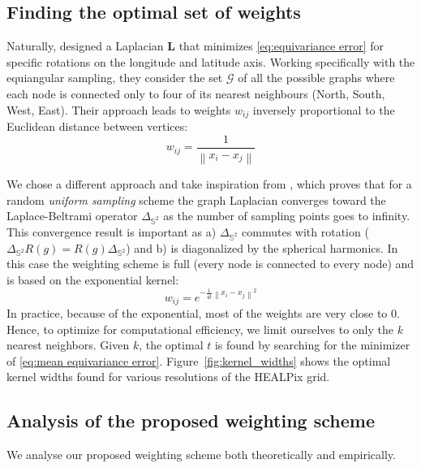 \documentclass{article} %
\newcommand{\norm}[1]{\left\lVert#1\right\rVert}
\renewcommand{\b}[1]{{\bm{#1}}}  %
\newcommand{\Figref}[1]{Figure~\ref{fig:#1}}
\begin{document}
\subsection{Finding the optimal set of weights}  \label{sec:optimal}
Naturally, \cite{khasanova2017sphericalcnn} designed a Laplacian $\b{L}$ that minimizes \eqref{eq:equivariance error} for specific rotations on the longitude and latitude axis. 
Working specifically with the equiangular sampling, they consider the set $\mathcal{G}$ of all the possible graphs where each node is connected only to four of its nearest neighbours (North, South, West, East).
Their approach leads to weights $w_{ij}$ inversely proportional to the Euclidean distance between vertices:
\begin{equation} \label{eqn:weights:khasanova}
	w_{ij} = \frac{1}{\norm{x_i-x_j}}
\end{equation}

We chose a different approach and take inspiration from \cite{belkin2005towards}, which proves that for a random \emph{uniform sampling} scheme the graph Laplacian converges toward the Laplace-Beltrami operator $\Delta_{\mathbb{S}^2}$ as the number of sampling points goes to infinity.
This convergence result is important as a) $\Delta_{\mathbb{S}^2}$ commutes with rotation ($\Delta_{\mathbb{S}^2}R(g) = R(g)\Delta_{\mathbb{S}^2}$) and b) is diagonalized by the spherical harmonics.
In this case the weighting scheme is full (every node is connected to every node) and is based on the exponential kernel:
\begin{equation} \label{eqn:weights:belkin}
w_{ij} = e^{-\frac{1}{4t} \norm{x_i-x_j}^2}
\end{equation}
In practice, because of the exponential, most of the weights are very close to $0$. Hence, to optimize for computational efficiency, we limit ourselves to only the $k$ nearest neighbors.
Given $k$, the optimal $t$ is found by searching for the minimizer of \eqref{eq:mean equivariance error}.
\Figref{kernel_widths} shows the optimal kernel widths found for various resolutions of the HEALPix grid.


\subsection{Analysis of the proposed weighting scheme}
We analyse our proposed weighting scheme both theoretically and empirically.
\end{document}
